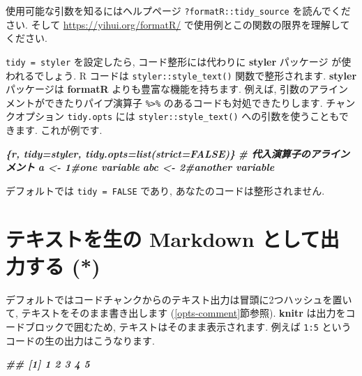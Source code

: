 \documentclass[
  11pt,
]{bxjsreport}
\newenvironment{Shaded}{\begin{snugshade}}{\end{snugshade}}
\newcommand{\InformationTok}[1]{\textcolor[rgb]{0.56,0.35,0.01}{\textbf{\textit{#1}}}}
\begin{document}
使用可能な引数を知るにはヘルプページ \texttt{?formatR::tidy\_source} を読んでください. そして \url{https://yihui.org/formatR/} で使用例とこの関数の限界を理解してください.

\texttt{tidy = styler} を設定したら, コード整形には代わりに \textbf{styler} パッケージ \autocite{R-styler} が使われるでしょう. R コードは \texttt{styler::style\_text()} 関数で整形されます. \textbf{styler} パッケージは \textbf{formatR} よりも豊富な機能を持ちます. 例えば, 引数のアラインメントができたりパイプ演算子 \texttt{\%\textgreater{}\%} のあるコードも対処できたりします. チャンクオプション \texttt{tidy.opts} には \texttt{styler::style\_text()} への引数を使うこともできます. これが例です.

\begin{Shaded}
\begin{Highlighting}[]
\InformationTok{\textasciigrave{}\textasciigrave{}\textasciigrave{}\{r, tidy=\textquotesingle{}styler\textquotesingle{}, tidy.opts=list(strict=FALSE)\}}
\InformationTok{\# 代入演算子のアラインメント}
\InformationTok{a   \textless{}{-} 1\#one variable}
\InformationTok{abc \textless{}{-} 2\#another variable}
\InformationTok{\textasciigrave{}\textasciigrave{}\textasciigrave{}}
\end{Highlighting}
\end{Shaded}

デフォルトでは \texttt{tidy = FALSE} であり, あなたのコードは整形されません.

\hypertarget{results-asis}{%
\section{テキストを生の Markdown として出力する (*)}\label{results-asis}}

デフォルトではコードチャンクからのテキスト出力は冒頭に2つハッシュを置いて, テキストをそのまま書き出します (\ref{opts-comment}節参照). \textbf{knitr} は出力をコードブロックで囲むため, テキストはそのまま表示されます. 例えば \texttt{1:5} というコードの生の出力はこうなります.

\begin{Shaded}
\begin{Highlighting}[]
\InformationTok{\textasciigrave{}\textasciigrave{}\textasciigrave{}}
\InformationTok{\#\# [1] 1 2 3 4 5}
\InformationTok{\textasciigrave{}\textasciigrave{}\textasciigrave{}}
\end{Highlighting}
\end{Shaded}
\end{document}
